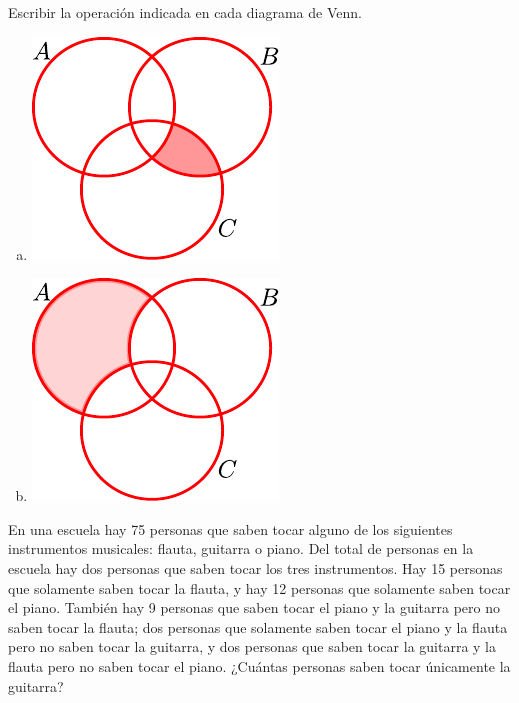 \documentclass[11pt]{article}
\begin{document}
\begin{exercise}
Escribir la operación indicada en cada diagrama de Venn.
\begin{multicols}{2}
    \begin{enumerate}[a)]
        \item \includegraphics[scale=1.0]{figs/fig-10.pdf}
        \item \includegraphics[scale=1.0]{figs/fig-11.pdf}
    \end{enumerate}
\end{multicols}
\end{exercise}

\begin{exercise}
En una escuela hay 75 personas que saben tocar alguno de los siguientes instrumentos musicales: flauta, guitarra o piano. Del total de personas en la escuela hay dos personas que saben tocar los tres instrumentos. Hay 15 personas que solamente saben tocar la flauta, y hay 12 personas que solamente saben tocar el piano. También hay 9 personas que saben tocar el piano y la guitarra pero no saben tocar la flauta; dos personas que solamente saben tocar el piano y la flauta pero no saben tocar la guitarra, y dos personas que saben tocar la guitarra y la flauta pero no saben tocar el piano. ¿Cuántas personas saben tocar únicamente la guitarra?
\end{exercise}
\end{document}
